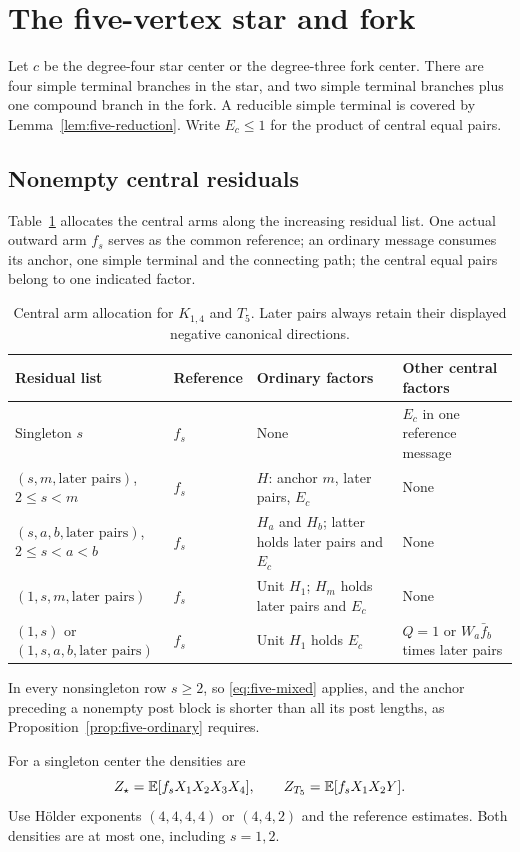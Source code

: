 \section{The five-vertex star and fork}\label{sec:five-star-fork}
Let $c$ be the degree-four star center or the degree-three fork center.
There are four simple terminal branches in the star, and two simple
terminal branches plus one compound branch in the fork. A reducible
simple terminal is covered by Lemma~\ref{lem:five-reduction}.
Write $E_c\le1$ for the product of central equal pairs.

\subsection{Nonempty central residuals}
Table~\ref{tab:five-center} allocates the central arms along the
increasing residual list. One actual outward arm $f_s$ serves as the
common reference; an ordinary message consumes its anchor, one simple
terminal and the connecting path; the central equal pairs belong to one
indicated factor.
\begin{table}[htbp]\centering\small
\caption{Central arm allocation for $K_{1,4}$ and $T_5$. Later pairs always retain their displayed negative canonical directions.}\label{tab:five-center}
\begin{tabular}{@{}p{38mm}p{19mm}p{43mm}p{40mm}@{}}\toprule
Residual list & Reference & Ordinary factors & Other central factors\\\midrule
Singleton $s$ & $f_s$ & None & $E_c$ in one reference message\\
$(s,m,\text{later pairs})$, $2\le s<m$ & $f_s$ & $H$: anchor $m$, later pairs, $E_c$ & None\\
$(s,a,b,\text{later pairs})$, $2\le s<a<b$ & $f_s$ & $H_a$ and $H_b$; latter holds later pairs and $E_c$ & None\\
$(1,s,m,\text{later pairs})$ & $f_s$ & Unit $H_1$; $H_m$ holds later pairs and $E_c$ & None\\
$(1,s)$ or $(1,s,a,b,\text{later pairs})$ & $f_s$ & Unit $H_1$ holds $E_c$ & $Q=1$ or $W_a\bar f_b$ times later pairs\\\bottomrule
\end{tabular}
\end{table}
In every nonsingleton row $s\ge2$, so \eqref{eq:five-mixed} applies,
and the anchor preceding a nonempty post block is shorter than all its
post lengths, as Proposition~\ref{prop:five-ordinary} requires.

For a singleton center the densities are
\[
 Z_\star=\mathbb E[f_sX_1X_2X_3X_4],\qquad
 Z_{T_5}=\mathbb E[f_sX_1X_2Y].
\]
Use H\"older exponents $(4,4,4,4)$ or $(4,4,2)$ and the reference
estimates. Both densities are at most one, including $s=1,2$.

